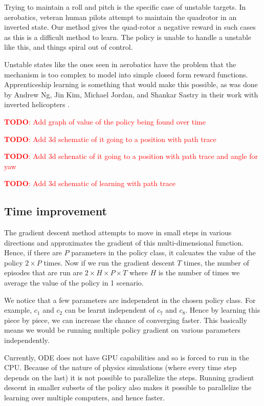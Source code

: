 \documentclass[BTech]{iitmdiss}
\newcommand\todo[1]{\textcolor{red}{{\bf TODO}: #1}}
\begin{document}
Trying to maintain a roll and pitch is the specific case of unstable targets. In aerobatics, veteran human pilots attempt to maintain the quadrotor in an inverted state. Our method gives the quad-rotor a negative reward in such cases as this is a difficult method to learn. The policy is unable to handle a unstable like this, and things spiral out of control.

Unstable states like the ones seen in aerobatics have the problem that the mechanism is too complex to model into simple closed form reward functions. Apprenticeship learning is something that would make this possible, as was done by Andrew Ng, Jin Kim, Michael Jordan, and Shankar Sastry in their work with inverted helicopters \cite{InvertedHelicopterFlight}.

\todo{Add graph of value of the policy being found over time}

\todo{Add 3d schematic of it going to a position with path trace}

\todo{Add 3d schenatic of it going to a position with path trace and angle for yaw}

\todo{Add 3d schematic of learning with path trace}

\subsection{Time improvement}

The gradient descent method attempts to move in small steps in various directions and approximates the gradient of this multi-dimensional function. Hence, if there are $P$ parameters in the policy class, it calcuates the value of the policy $2 \times P$ times. Now if we run the gradient descent $T$ times, the number of episodes that are run are $2 \times H \times P \times T$ where $H$ is the number of times we average the value of the policy in 1 scenario. 

We notice that a few parameters are independent in the chosen policy class. For example, $c_1$ and $c_2$ can be learnt independent of $c_7$ and $c_8$. Hence by learning this piece by piece, we can increase the chance of converging faster. This basically means we would be running multiple policy gradient on various parameters independently.

Currently, ODE does not have GPU capabilities and so is forced to run in the CPU. Because of the nature of physics simulations (where every time step depends on the last) it is not possible to parallelize the steps. Running gradient descent in smaller subsets of the policy also makes it possible to parallelize the learning over multiple computers, and hence faster.
\end{document}
